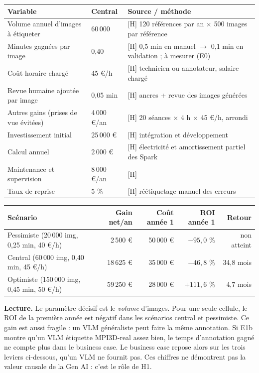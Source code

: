 \documentclass[10pt,a4paper]{article}
\begin{document}
\begin{center}\small
\begin{tabularx}{\textwidth}{@{}P{4.3cm}P{2.3cm}L@{}}
\toprule
Variable & Central & Source / méthode \\
\midrule
Volume annuel d'images à étiqueter & 60\,000 & [H] 120 références par an $\times$ 500 images par référence \\
Minutes gagnées par image & 0,40 & [H] 0,5 min en manuel $\to$ 0,1 min en validation ; à mesurer (E0) \\
Coût horaire chargé & 45 €/h & [H] technicien ou annotateur, salaire chargé \\
Revue humaine ajoutée par image & 0,05 min & [H] ancres + revue des images générées \\
Autres gains (prises de vue évitées) & 4\,000 €/an & [H] 20 séances $\times$ 4 h $\times$ 45 €/h, arrondi \\
Investissement initial & 25\,000 € & [H] intégration et développement \\
Calcul annuel & 2\,000 € & [H] électricité et amortissement partiel des Spark \\
Maintenance et supervision & 8\,000 €/an & [H] \\
Taux de reprise & 5 \% & [H] réétiquetage manuel des erreurs \\
\bottomrule
\end{tabularx}

\vspace{4pt}
\begin{tabular}{@{}lrrrr@{}}
\toprule
Scénario & Gain net/an & Coût année 1 & ROI année 1 & Retour \\
\midrule
Pessimiste (20\,000 img, 0,25 min, 40 €/h) & 2\,500 € & 50\,000 € & $-95{,}0$ \% & non atteint \\
Central (60\,000 img, 0,40 min, 45 €/h) & 18\,625 € & 35\,000 € & $-46{,}8$ \% & 34,8 mois \\
Optimiste (150\,000 img, 0,45 min, 50 €/h) & 59\,250 € & 28\,000 € & $+111{,}6$ \% & 4,7 mois \\
\bottomrule
\end{tabular}
\end{center}

\textbf{Lecture.} Le paramètre décisif est le \emph{volume} d'images. Pour une seule cellule, le ROI de la première année est négatif dans les scénarios central et pessimiste. Ce gain est aussi fragile : un VLM généraliste peut faire la même annotation. Si E1b montre qu'un VLM étiquette MPI3D-real assez bien, le temps d'annotation gagné ne compte plus dans le business case. Le business case repose alors sur les trois leviers ci-dessous, qu'un VLM ne fournit pas. Ces chiffres ne démontrent pas la valeur causale de la Gen AI : c'est le rôle de H1.
\end{document}
